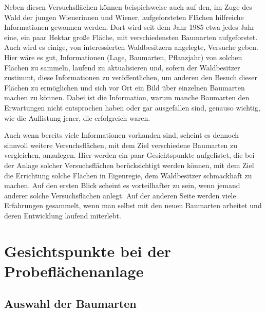 \documentclass[twocolumn]{scrartcl}
\begin{document}
Neben diesen Versuchsflächen können beispielsweise auch auf den, im Zuge des
\glqq{}Wald der jungen Wienerinnen und Wiener\grqq{}, aufgeforsteten Flächen
hilfreiche Informationen gewonnen werden. Dort wird seit dem Jahr 1985 etwa
jedes Jahr eine, ein paar Hektar große Fläche, mit verschiedensten Baumarten
aufgeforstet. Auch wird es einige, von interessierten Waldbesitzern angelegte,
Versuche geben. Hier wäre es gut, Informationen (Lage, Baumarten, Pflanzjahr)
von solchen Flächen zu sammeln, laufend zu aktualisieren und, sofern der
Waldbesitzer zustimmt, diese Informationen zu veröffentlichen, um anderen den
Besuch dieser Flächen zu ermöglichen und sich vor Ort ein Bild über einzelnen
Baumarten machen zu können. Dabei ist die Information, warum manche Baumarten
den Erwartungen nicht entsprochen haben oder gar ausgefallen sind, genauso
wichtig, wie die Auflistung jener, die erfolgreich waren.

Auch wenn bereits viele Informationen vorhanden sind, scheint es dennoch
sinnvoll weitere Versuchsflächen, mit dem Ziel verschiedene Baumarten zu
vergleichen, anzulegen. Hier werden ein paar Gesichtspunkte aufgelistet, die bei
der Anlage solcher Versuchsflächen berücksichtigt werden können, mit dem Ziel
die Errichtung solche Flächen in Eigenregie, dem Waldbesitzer schmackhaft zu
machen. Auf den ersten Blick scheint es vorteilhafter zu sein, wenn jemand
anderer solche Versuchsflächen anlegt. Auf der anderen Seite werden viele
Erfahrungen gesammelt, wenn man selbst mit den neuen Baumarten arbeitet und
deren Entwicklung laufend miterlebt.

\section{Gesichtspunkte bei der Probeflächenanlage}

\subsection{Auswahl der Baumarten}
\end{document}
